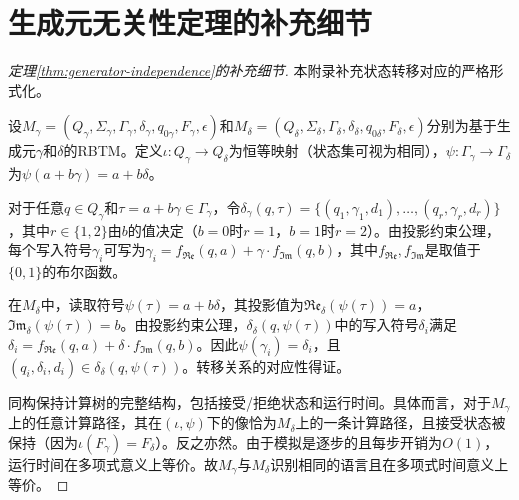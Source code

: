 \documentclass{ctexart}
\newtheorem{proof}[theorem]{证明}
\begin{document}
	\section{生成元无关性定理的补充细节}
	
	\begin{proof}[定理\ref{thm:generator-independence}的补充细节]
		本附录补充状态转移对应的严格形式化。
		
		设$M_\gamma = (Q_\gamma, \Sigma_\gamma, \Gamma_\gamma, \delta_\gamma, q_{0\gamma}, F_\gamma, \epsilon)$和$M_\delta = (Q_\delta, \Sigma_\delta, \Gamma_\delta, \delta_\delta, q_{0\delta}, F_\delta, \epsilon)$分别为基于生成元$\gamma$和$\delta$的RBTM。定义$\iota: Q_\gamma \to Q_\delta$为恒等映射（状态集可视为相同），$\psi: \Gamma_\gamma \to \Gamma_\delta$为$\psi(a+b\gamma) = a+b\delta$。
		
		对于任意$q \in Q_\gamma$和$\tau = a+b\gamma \in \Gamma_\gamma$，令$\delta_\gamma(q,\tau) = \{(q_1,\gamma_1,d_1), \ldots, (q_r,\gamma_r,d_r)\}$，其中$r \in \{1,2\}$由$b$的值决定（$b=0$时$r=1$，$b=1$时$r=2$）。由投影约束公理，每个写入符号$\gamma_i$可写为$\gamma_i = f_{\mathfrak{Re}}(q,a) + \gamma \cdot f_{\mathfrak{Im}}(q,b)$，其中$f_{\mathfrak{Re}}, f_{\mathfrak{Im}}$是取值于$\{0,1\}$的布尔函数。
		
		在$M_\delta$中，读取符号$\psi(\tau) = a+b\delta$，其投影值为$\mathfrak{Re}_\delta(\psi(\tau)) = a$，$\mathfrak{Im}_\delta(\psi(\tau)) = b$。由投影约束公理，$\delta_\delta(q,\psi(\tau))$中的写入符号$\delta_i$满足$\delta_i = f_{\mathfrak{Re}}(q,a) + \delta \cdot f_{\mathfrak{Im}}(q,b)$。因此$\psi(\gamma_i) = \delta_i$，且$(q_i, \delta_i, d_i) \in \delta_\delta(q, \psi(\tau))$。转移关系的对应性得证。
		
		同构保持计算树的完整结构，包括接受/拒绝状态和运行时间。具体而言，对于$M_\gamma$上的任意计算路径，其在$(\iota,\psi)$下的像恰为$M_\delta$上的一条计算路径，且接受状态被保持（因为$\iota(F_\gamma)=F_\delta$）。反之亦然。由于模拟是逐步的且每步开销为$O(1)$，运行时间在多项式意义上等价。故$M_\gamma$与$M_\delta$识别相同的语言且在多项式时间意义上等价。
	\end{proof}
	
	
	
	
\end{document}
